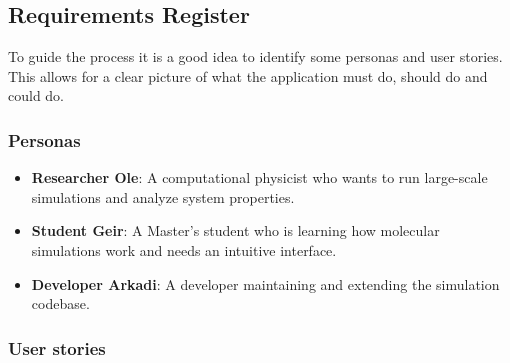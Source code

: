\documentclass{article}
\begin{document}
\subsection*{Requirements Register}

To guide the process it is a good idea to identify some personas and user stories. This allows for a clear picture of what the application must do, should do and could do.

\subsubsection*{Personas}

\begin{itemize}
    \item \textbf{Researcher Ole}: A computational physicist who wants to run large-scale simulations and analyze system properties.
    \item \textbf{Student Geir}: A Master's student who is learning how molecular simulations work and needs an intuitive interface.
    \item \textbf{Developer Arkadi}: A developer maintaining and extending the simulation codebase.
\end{itemize}

\subsubsection*{User stories}
\end{document}
